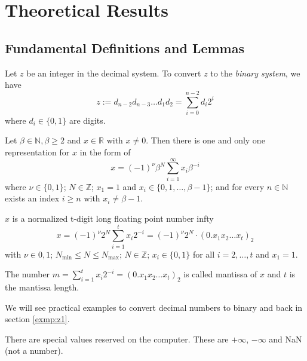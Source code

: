 \section{Theoretical Results}
\subsection{Fundamental Definitions and Lemmas}
\begin{definition}
    Let \(z\) be an integer in the decimal system. To convert \(z\) to the \textit{binary system}, we have
    \begin{equation*}
        z := d_{n-2}d_{n-3}\dots d_1 d_2 = \sum_{i = 0}^{n-2}d_i 2^i
    \end{equation*}
    where \(d_i \in \{0, 1\}\) are digits. \cite{bib:rabus}
\end{definition}
%
\begin{lemma} \label{theo:bina}
    Let \(\beta \in \mathbb{N}, \beta \geq 2\) and \(x \in \mathbb{R}\) with \(x \neq 0\). Then there is one and only one representation for \(x\) in the form of
    \begin{equation*}
        x = (-1)^{\nu} \beta^N \sum_{i = 1}^{\infty}x_i \beta^{-i}
    \end{equation*}
    where \(\nu \in \{0, 1\}\); \(N \in \mathbb{Z}\); \(x_1 = 1\) and \(x_i \in \{0, 1, \dots , \beta - 1\}\); and for every \(n \in \mathbb{N}\) exists an index \(i \geq n\) with \(x_i \neq \beta - 1\). \cite{bib:rabus}
\end{lemma}
%
\begin{definition}
    \(x\) is a normalized t-digit long floating point number infty
    \begin{equation*}
        x = (-1)^{\nu} 2^N \sum_{i = 1}^{t}x_i 2^{-i} = (-1)^{\nu} 2^N \cdot (0.x_1 x_2 \dots x_t)_2
    \end{equation*}
    with \(\nu \in {0, 1}\); \(N_{\text{min}} \leq N \leq N_{\text{max}}\); \(N \in \mathbb{Z}\); \(x_i \in \{0, 1\}\) for all \(i = 2, \dots, t\) and \(x_1 = 1\).

    The number \(m = \sum_{i = 1}^{t}x_i 2^{-i} = (0.x_1 x_2 \dots x_t)_2\) is called mantissa of \(x\) and \(t\) is the mantissa length.  \cite{bib:rabus}
\end{definition}
We will see practical examples to convert decimal numbers to binary and back in section \ref{exmp:z1}.
\begin{remark}
There are special values reserved on the computer. These are \(+\infty\), \(-\infty\) and NaN (not a number).  \cite{bib:rabus}
\end{remark}
